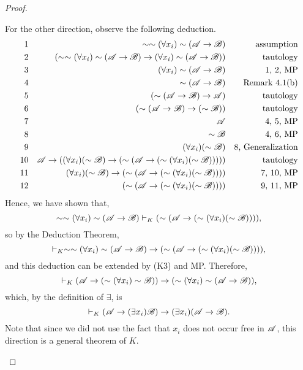 \begin{proposition}
\begin{proof}
\begin{enumerate}
\begin{enumerate}
            For the other direction, observe the following deduction.
            \begin{align*}
              \text{1}&&
              \sim\sim(\forall x_i)\sim(\mathscr{A} \rightarrow \mathscr{B})&&
              \text{assumption}\\
              \text{2}&&
              (\sim\sim(\forall x_i)\sim(\mathscr{A} \rightarrow \mathscr{B}) \rightarrow (\forall x_i)\sim(\mathscr{A} \rightarrow \mathscr{B}))&&
              \text{tautology}\\
              \text{3}&&
              (\forall x_i)\sim(\mathscr{A} \rightarrow \mathscr{B})&&
              \text{1, 2, MP}\\
              \text{4}&&
              \sim(\mathscr{A} \rightarrow \mathscr{B})&&
              \text{Remark 4.1(b)}\\
              \text{5}&&
              (\sim(\mathscr{A} \rightarrow \mathscr{B}) \rightarrow \mathscr{A})&&
              \text{tautology}\\
              \text{6}&&
              (\sim(\mathscr{A} \rightarrow \mathscr{B}) \rightarrow (\sim\mathscr{B}))&&
              \text{tautology}\\
              \text{7}&&
              \mathscr{A}&&
              \text{4, 5, MP}\\
              \text{8}&&
              \sim\mathscr{B}&&
              \text{4, 6, MP}\\
              \text{9}&&
              (\forall x_i)(\sim\mathscr{B})&&
              \text{8, Generalization}\\
              \text{10}&&
              \mathscr{A} \rightarrow ((\forall x_i)(\sim\mathscr{B}) \rightarrow (\sim(\mathscr{A} \rightarrow (\sim(\forall x_i)(\sim\mathscr{B})))))&&
              \text{tautology}\\
              \text{11}&&
              (\forall x_i)(\sim\mathscr{B}) \rightarrow (\sim(\mathscr{A} \rightarrow (\sim(\forall x_i)(\sim\mathscr{B}))))&&
              \text{7, 10, MP}\\
              \text{12}&&
              (\sim(\mathscr{A} \rightarrow (\sim(\forall x_i)(\sim\mathscr{B}))))&&
              \text{9, 11, MP}
            \end{align*}
            Hence, we have shown that,
            \[\sim\sim(\forall x_i)\sim(\mathscr{A} \rightarrow \mathscr{B}) \vdash_{K} (\sim(\mathscr{A} \rightarrow (\sim(\forall x_i)(\sim\mathscr{B})))),\]
            so by the Deduction Theorem,
            \[\vdash_{K} \sim\sim(\forall x_i)\sim(\mathscr{A} \rightarrow \mathscr{B}) \rightarrow (\sim(\mathscr{A} \rightarrow (\sim(\forall x_i)(\sim\mathscr{B})))),\]
            and this deduction can be extended by (K3) and MP. Therefore,
            \[\vdash_{K} (\mathscr{A} \rightarrow (\sim(\forall x_i)\sim\mathscr{B})) \rightarrow (\sim(\forall x_i)\sim(\mathscr{A} \rightarrow \mathscr{B})),\]
            which, by the definition of \(\exists\), is
            \[\vdash_{K} (\mathscr{A} \rightarrow (\exists x_i)\mathscr{B}) \rightarrow (\exists x_i)(\mathscr{A} \rightarrow \mathscr{B}).\]
            Note that since we did not use the fact that \(x_i\) does not occur free in \(\mathscr{A}\), this direction is a general theorem of \(K\).
        \end{enumerate}


\end{enumerate}
\end{proof}
\end{proposition}
